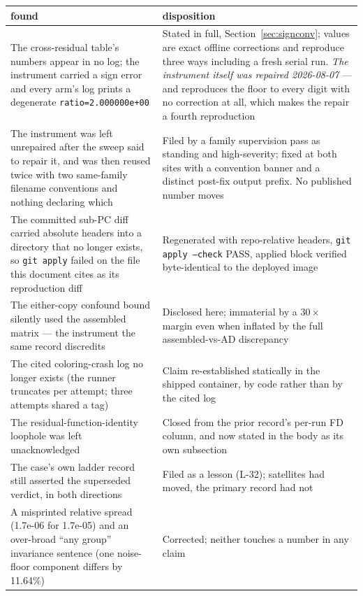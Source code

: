\documentclass[11pt,a4paper]{article}
\begin{document}
\begin{table}[htbp]
\centering\small
\begin{tabular}{@{}L{7.4cm}L{7.4cm}@{}}
\toprule
found & disposition \\
\midrule
The cross-residual table's numbers appear in no log; the instrument carried a sign error and every arm's log prints a degenerate \texttt{ratio=2.000000e+00} & Stated in full, Section~\ref{sec:signconv}; values are exact offline corrections and reproduce three ways including a fresh serial run. \emph{The instrument itself was repaired 2026-08-07} --- and reproduces the floor to every digit with no correction at all, which makes the repair a fourth reproduction \\
\addlinespace
The instrument was left unrepaired after the sweep said to repair it, and was then reused twice with two same-family filename conventions and nothing declaring which & Filed by a family supervision pass as standing and high-severity; fixed at both sites with a convention banner and a distinct post-fix output prefix. No published number moves \\
\addlinespace
The committed sub-PC diff carried absolute headers into a directory that no longer exists, so \texttt{git apply} failed on the file this document cites as its reproduction diff & Regenerated with repo-relative headers, \texttt{git apply --check} PASS, applied block verified byte-identical to the deployed image \\
The either-copy confound bound silently used the assembled matrix --- the instrument the same record discredits & Disclosed here; immaterial by a \(30\times\) margin even when inflated by the full assembled-vs-AD discrepancy \\
The cited coloring-crash log no longer exists (the runner truncates per attempt; three attempts shared a tag) & Claim re-established statically in the shipped container, by code rather than by the cited log \\
The residual-function-identity loophole was left unacknowledged & Closed from the prior record's per-run FD column, and now stated in the body as its own subsection \\
The case's own ladder record still asserted the superseded verdict, in both directions & Filed as a lesson (L-32); satellites had moved, the primary record had not \\
A misprinted relative spread (1.7e-06 for 1.7e-05) and an over-broad ``any group'' invariance sentence (one noise-floor component differs by 11.64\%) & Corrected; neither touches a number in any claim \\

\end{tabular}
\end{table}
\end{document}
